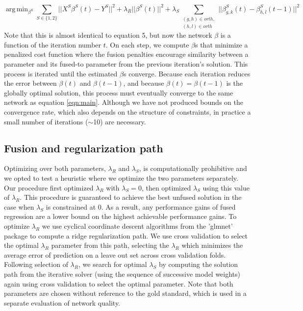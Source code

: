 \documentclass[11pt]{article}
\DeclareMathOperator*{\argmin}{arg\,min}
\begin{document}
\begin{equation}
\argmin_{\beta^S} \displaystyle\sum_{S \in \{1, 2\}} ||X^{S}\beta^{S}(t) - Y^{S}||^2 + \lambda_R||\beta^{S}(t)||^2 + \lambda_S\displaystyle \sum_{\substack{(g,h) \in orth,\\
 (h,l) \in orth}} ||\beta^{S}_{g,k}(t) - \beta_{h,l}^{S}(t-1)||^2
\end{equation}
Note that this is almost identical to equation 5, but now the network $\beta$ is a function of the iteration number $t$. On each step, we compute $\beta$s that minimize a penalized cost function where the fusion penalties encourage similarity between a parameter and its fused-to parameter from the previous iteration's solution. 
This process is iterated until the estimated $\beta$s converge. 
Because each iteration reduces the error between $\beta(t)$ and $\beta(t-1)$, and because $\beta(t) = \beta(t-1)$ is the globally optimal solution, this process must eventually converge to the same network as equation \ref{eqn:main}. 
Although we have not produced bounds on the convergence rate, which also depends on the structure of constraints, in practice a small number of iterations ($\sim$10) are necessary.


\subsection{Fusion and regularization path}
Optimizing over both parameters, $\lambda_R$ and $\lambda_S$, is computationally prohibitive and we opted to test a heuristic where we optimize the two parameters separately. 
Our procedure first optimized $\lambda_R$ with $\lambda_S=0$, then optimized $\lambda_S$ using this value of $\lambda_R$. 
This procedure is guaranteed to achieve the best unfused solution in the case when $\lambda_S$ is constrained at 0. 
As a result, any performance gains of fused regression are a lower bound on the highest achievable performance gains. 
To optimize $\lambda_R$ we use cyclical coordinate descent algorithms from the 'glmnet' package \cite{friedman_regularization_2010} to compute a ridge regularization path. 
We use cross validation to select the optimal $\lambda_R$ parameter from this path, selecting the $\lambda_R$ which minimizes the average error of prediction on a leave out set across cross validation folds. 
Following selection of $\lambda_R$, we search for optimal $\lambda_S$ by computing the solution path from the iterative solver (using the sequence of successive model weights) again using cross validation to select the optimal parameter. 
Note that both parameters are chosen without reference to the gold standard, which is used in a separate evaluation of network quality. 
\end{document}

